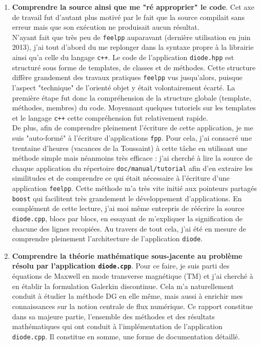 \documentclass[a4paper,oneside,10pt]{report}
\begin{document}
\begin{enumerate}
\item \textbf{Comprendre la source ainsi que me "ré approprier" le code}. Cet axe de travail fut d'autant plus motivé par le fait que la source compilait sans erreur mais que son exécution ne produisait aucun résultat.\\
N'ayant fait que très peu de \texttt{feelpp} auparavant (dernière utilisation en juin 2013), j'ai tout d'abord du me replonger dans la syntaxe propre à la librairie ainsi qu'a celle du langage \texttt{c++}. Le code de l'application \texttt{diode.hpp} est structuré sous forme de templates, de classes et de méthodes. Cette structure diffère grandement des travaux pratiques \texttt{feelpp} vus jusqu'alors, puisque l'aspect "technique" de l'orienté objet y était volontairement écarté. La première étape fut donc la compréhension de la structure globale (template, méthodes, membres) du code. Moyennant quelques tutoriels sur les templates et le langage \texttt{c++} cette compréhension fut relativement rapide. \\
De plus, afin de comprendre pleinement l'écriture de cette application, je me suis "auto-formé" à l'écriture d'applications \texttt{fpp}. Pour cela, j'ai consacré une trentaine d'heures (vacances de la Toussaint) à cette tâche en utilisant une méthode simple mais néanmoins très efficace : j'ai cherché à lire la source de chaque application du répertoire \texttt{doc/manual/tutorial} afin d'en extraire les similitudes et de comprendre ce qui était nécessaire à l'écriture d'une application \texttt{feelpp}. Cette méthode m'a très vite initié aux pointeurs partagés \texttt{boost} qui facilitent très grandement le développement d'applications. En complément de cette lecture, j'ai moi même entrepris de réécrire la source \texttt{diode.cpp}, blocs par blocs, en essayant de m'expliquer la signification de chacune des lignes recopiées. Au travers de tout cela, j'ai été en mesure de comprendre pleinement l'architecture de l'application \texttt{diode}.
\item \textbf{Comprendre la théorie mathématique sous-jacente au problème résolu par l'application \texttt{diode.cpp}}. Pour ce faire, je suis parti des équations de Maxwell en mode transverse magnétique (TM) et j'ai cherché à en établir la formulation Galerkin discontinue. Cela m'a naturellement conduit à étudier la méthode DG en elle même, mais aussi à enrichir mes connaissances sur la notion centrale de flux numérique.
Ce rapport constitue dans sa majeure partie, l'ensemble des méthodes et des résultats mathématiques qui ont conduit à l'implémentation de l'application \texttt{diode.cpp}. Il constitue en somme, une forme de documentation détaillé.

\end{enumerate}
\end{document}
